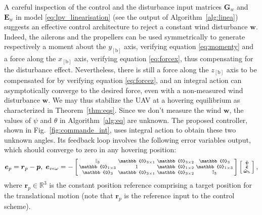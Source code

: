 A careful inspection of the control and the disturbance input matrices $\boldsymbol{G}_{w}$ and $\boldsymbol{E}_{w}$ in model \eqref{eq:lpv_linearisation} (see the output of Algorithm~\ref{alg:linea}) suggests an effective control architecture to reject a constant wind disturbance $\boldsymbol{w}$. Indeed, the ailerons and the propellers can be used symmetrically to generate respectively a moment about the $y_{[\text{b}]}$ axis, verifying equation \eqref{eq:momenty} and a force along the $x_{[\text{b}]}$ axis, verifying equation \eqref{eq:forcex}, thus compensating for the disturbance effect. Nevertheless, there is still a force along the $z_{[\text{b}]}$ axis to be compensated for by verifying equation \eqref{eq:forcez}, and an integral action can asymptotically converge to the desired force, even with a non-measured wind disturbance $\boldsymbol{w}$. We may thus stabilize the UAV at a hovering equilibrium as characterized in Theorem~\ref{thm:eqs}. Since we don't measure the wind $\boldsymbol{w}$, the values of $\psi$ and $\theta$ in Algorithm~\ref{alg:eq} are unknown. The proposed controller, shown in Fig.~\ref{fig:commande_int}, uses integral action to obtain these two unknown angles. Its feedback loop involves the following error variables output, which should converge to zero in any hovering position:
\begin{align}
  \boldsymbol{e}_{p}= \boldsymbol{r}_{p} - \boldsymbol{p}, \; \boldsymbol{e}_{v \epsilon \omega} = -  
     \left[ \begin{smallmatrix} \mathbb{I}_{3}  & \mathbb{0}_{3\times 1} & \mathbb{0}_{3\times 2} & \mathbb{0}_{3}\\
     \mathbb{0}_{1\times 3}  & 1 & \mathbb{0}_{1\times 2} & \mathbb{0}_{1 \times 3} \\
         \mathbb{0}_{3}  & \mathbb{0}_{3\times 1} & \mathbb{0}_{3\times 2} &   \mathbb{I}_{3}
         \end{smallmatrix} \right]
  \smallmat{
         \tilde{\boldsymbol{v}} \\
         \tilde{\boldsymbol{\epsilon}} \\
         \tilde{\boldsymbol{\omega}}_{\text{b}} 
     },
\label{eq:error_var}
\end{align}    
where $\boldsymbol{r}_{p} \in \mathbb{R}^{3}$ is the constant position reference comprising a target position for the translational motion (note that $\boldsymbol{r}_{p}$ is the reference input to the control scheme).

